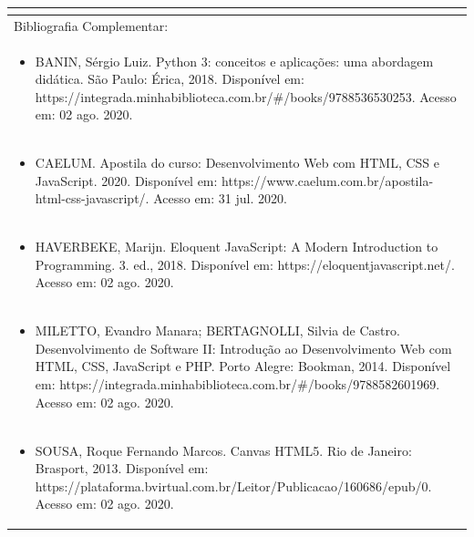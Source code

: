 \documentclass[11pt]{article}
\begin{document}
\begin{center}
\begin{longtable}{|p{4cm}|p{4cm}|p{4cm}|p{4cm}|}
\multicolumn{4}{|p{16cm}|}{}\\
\hline
\multicolumn{4}{|p{16cm}|}{Bibliografia Complementar:}\\*
\multicolumn{4}{|p{\dimexpr 16cm + 6\tabcolsep\relax}|}{\begin{itemize}\item BANIN, Sérgio Luiz. Python 3: conceitos e aplicações: uma abordagem didática. São Paulo: Érica, 2018. Disponível em: https://integrada.minhabiblioteca.com.br/\#/books/9788536530253. Acesso em: 02 ago. 2020.\end{itemize}}\\
\multicolumn{4}{|p{\dimexpr 16cm + 6\tabcolsep\relax}|}{\begin{itemize}\item CAELUM. Apostila do curso: Desenvolvimento Web com HTML, CSS e JavaScript. 2020. Disponível em: https://www.caelum.com.br/apostila-html-css-javascript/. Acesso em: 31 jul. 2020.\end{itemize}}\\
\multicolumn{4}{|p{\dimexpr 16cm + 6\tabcolsep\relax}|}{\begin{itemize}\item HAVERBEKE, Marijn. Eloquent JavaScript: A Modern Introduction to Programming. 3. ed., 2018. Disponível em: https://eloquentjavascript.net/. Acesso em: 02 ago. 2020.\end{itemize}}\\
\multicolumn{4}{|p{\dimexpr 16cm + 6\tabcolsep\relax}|}{\begin{itemize}\item MILETTO, Evandro Manara; BERTAGNOLLI, Silvia de Castro. Desenvolvimento de Software II: Introdução ao Desenvolvimento Web com HTML, CSS, JavaScript e PHP. Porto Alegre: Bookman, 2014. Disponível em: https://integrada.minhabiblioteca.com.br/\#/books/9788582601969. Acesso em: 02 ago. 2020.\end{itemize}}\\
\multicolumn{4}{|p{\dimexpr 16cm + 6\tabcolsep\relax}|}{\begin{itemize}\item SOUSA, Roque Fernando Marcos. Canvas HTML5. Rio de Janeiro: Brasport, 2013. Disponível em: https://plataforma.bvirtual.com.br/Leitor/Publicacao/160686/epub/0. Acesso em: 02 ago. 2020.\end{itemize}}\\
\hline
\end{longtable}
\end{center}
\end{document}
